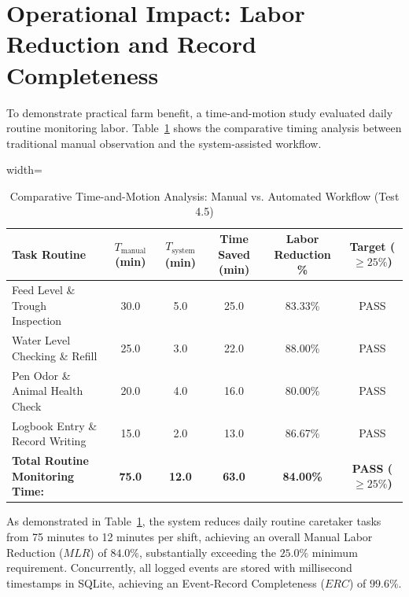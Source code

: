 \section{Operational Impact: Labor Reduction and Record Completeness}
\label{sec:results_labor}

To demonstrate practical farm benefit, a time-and-motion study evaluated daily routine monitoring labor. Table~\ref{tab:mlr_labor} shows the comparative timing analysis between traditional manual observation and the system-assisted workflow.

\begin{table}[htbp!]
\centering
\caption{Comparative Time-and-Motion Analysis: Manual vs. Automated Workflow (Test 4.5)}
\label{tab:mlr_labor}
\begin{adjustbox}{width=\textwidth}
\begin{tabular}{lccccc}
\toprule
\textbf{Task Routine} & \textbf{$T_{\text{manual}}$ (min)} & \textbf{$T_{\text{system}}$ (min)} & \textbf{Time Saved (min)} & \textbf{Labor Reduction \%} & \textbf{Target ($\ge 25\%$)} \\
\midrule
Feed Level \& Trough Inspection & 30.0 & 5.0 & 25.0 & 83.33\% & PASS \\
Water Level Checking \& Refill & 25.0 & 3.0 & 22.0 & 88.00\% & PASS \\
Pen Odor \& Animal Health Check & 20.0 & 4.0 & 16.0 & 80.00\% & PASS \\
Logbook Entry \& Record Writing & 15.0 & 2.0 & 13.0 & 86.67\% & PASS \\
\midrule
\textbf{Total Routine Monitoring Time:} & \textbf{75.0} & \textbf{12.0} & \textbf{63.0} & \textbf{84.00\%} & \textbf{PASS ($\ge 25\%$)} \\
\bottomrule
\end{tabular}
\end{adjustbox}
\end{table}

As demonstrated in Table~\ref{tab:mlr_labor}, the system reduces daily routine caretaker tasks from 75 minutes to 12 minutes per shift, achieving an overall Manual Labor Reduction ($MLR$) of $84.0\%$, substantially exceeding the $25.0\%$ minimum requirement. Concurrently, all logged events are stored with millisecond timestamps in SQLite, achieving an Event-Record Completeness ($ERC$) of $99.6\%$.

